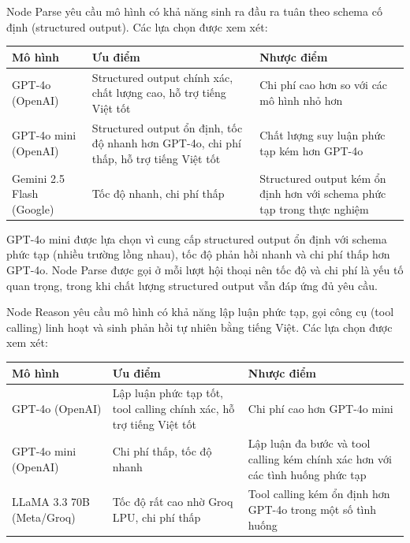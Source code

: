 Node Parse yêu cầu mô hình có khả năng sinh ra đầu ra tuân theo schema cố định (structured output). Các lựa chọn được xem xét:

\begin{table}[H]
    \centering
    \small
    \renewcommand{\arraystretch}{1.3}
    \begin{tabular}{|p{3cm}|p{5cm}|p{5cm}|}
        \hline
        \textbf{Mô hình} & \textbf{Ưu điểm} & \textbf{Nhược điểm} \\
        \hline
        
        GPT-4o (OpenAI)
        & Structured output chính xác, chất lượng cao, hỗ trợ tiếng Việt tốt
        & Chi phí cao hơn so với các mô hình nhỏ hơn \\
        \hline
        
        GPT-4o mini (OpenAI)
        & Structured output ổn định, tốc độ nhanh hơn GPT-4o, chi phí thấp, hỗ trợ tiếng Việt tốt
        & Chất lượng suy luận phức tạp kém hơn GPT-4o \\
        \hline
        
        Gemini 2.5 Flash (Google)
        & Tốc độ nhanh, chi phí thấp
        & Structured output kém ổn định hơn với schema phức tạp trong thực nghiệm \\
        \hline
    \end{tabular}
\end{table}

GPT-4o mini được lựa chọn vì cung cấp structured output ổn định với schema phức tạp (nhiều trường lồng nhau), tốc độ phản hồi nhanh và chi phí thấp hơn GPT-4o. Node Parse được gọi ở mỗi lượt hội thoại nên tốc độ và chi phí là yếu tố quan trọng, trong khi chất lượng structured output vẫn đáp ứng đủ yêu cầu.

Node Reason yêu cầu mô hình có khả năng lập luận phức tạp, gọi công cụ (tool calling) linh hoạt và sinh phản hồi tự nhiên bằng tiếng Việt. Các lựa chọn được xem xét:

\begin{table}[H]
    \centering
    \small
    \renewcommand{\arraystretch}{1.3}
    \begin{tabular}{|p{3cm}|p{5cm}|p{5cm}|}
        \hline
        \textbf{Mô hình} & \textbf{Ưu điểm} & \textbf{Nhược điểm} \\
        \hline
        
        GPT-4o (OpenAI)
        & Lập luận phức tạp tốt, tool calling chính xác, hỗ trợ tiếng Việt tốt
        & Chi phí cao hơn GPT-4o mini \\
        \hline
        
        GPT-4o mini (OpenAI)
        & Chi phí thấp, tốc độ nhanh
        & Lập luận đa bước và tool calling kém chính xác hơn với các tình huống phức tạp \\
        \hline
        
        LLaMA 3.3 70B (Meta/Groq)
        & Tốc độ rất cao nhờ Groq LPU, chi phí thấp
        & Tool calling kém ổn định hơn GPT-4o trong một số tình huống \\
        \hline
    \end{tabular}
\end{table}

